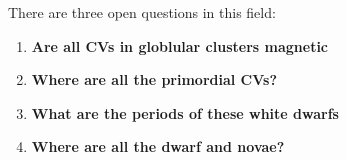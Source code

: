 There are three open questions in this field:

\begin{enumerate}
        \item \textbf{Are all CVs in globlular clusters magnetic}
        \item \textbf{Where are all the primordial CVs?}
        \item \textbf{What are the periods of these white dwarfs}
        \item \textbf{Where are all the dwarf and novae?}
\end{enumerate}


